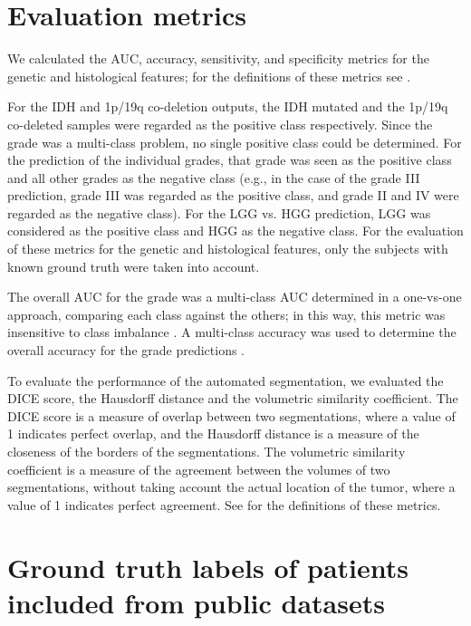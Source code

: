 \begin{subappendices}
\newpage
\section{Evaluation metrics}\label{app:metric_defs}

We calculated the AUC, accuracy, sensitivity, and specificity metrics for the genetic and histological features; for the definitions of these metrics see \autocite{tharwat2018metrics}.

For the \gls{IDH} and 1p/19q co-deletion outputs, the \gls{IDH} mutated and the 1p/19q co-deleted samples were regarded as the positive class respectively.
Since the grade was a multi-class problem, no single positive class could be determined.
For the prediction of the individual grades, that grade was seen as the positive class and all other grades as the negative class (e.g., in the case of the grade III prediction, grade III was regarded as the positive class, and grade II and IV were regarded as the negative class).
For the \gls{LGG} vs. \gls{HGG} prediction, \gls{LGG} was considered as the positive class and \gls{HGG} as the negative class.
For the evaluation of these metrics for the genetic and histological features, only the subjects with known ground truth were taken into account.

The overall AUC for the grade was a multi-class AUC determined in a one-vs-one approach, comparing each class against the others; in this way, this metric was insensitive to class imbalance \autocite{hand2001AUC}.
A multi-class accuracy was used to determine the overall accuracy for the grade predictions \autocite{tharwat2018metrics}.


To evaluate the performance of the automated segmentation, we  evaluated the DICE score, the Hausdorff distance and the volumetric similarity coefficient.
The DICE score is a measure of overlap between two segmentations, where a value of 1 indicates perfect overlap, and the Hausdorff distance is a measure of the closeness of the borders of the segmentations.
The volumetric similarity coefficient is a measure of the agreement between the volumes of two segmentations, without taking account the actual location of the tumor, where a value of 1 indicates perfect agreement.
See \autocite{taha2015metrics} for the definitions of these metrics.

\newpage

\section{Ground truth labels of patients included from public datasets}\label{app:open_gt}
\underline{}


\end{subappendices}

